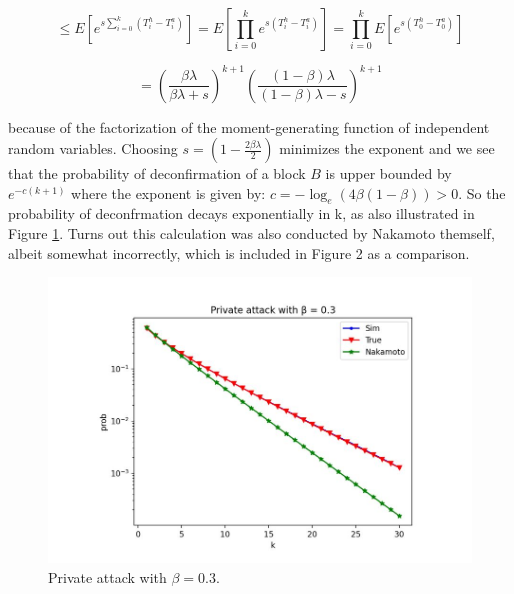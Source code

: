 \begin{equation}
    \leq E[e^{s\sum_{i=0}^{k}(T_{i}^{h} - T_{i}^{a})}] = E[\prod_{i=0}^{k}e^{s(T_{i}^{h} - T_{i}^{a})}] = \prod_{i=0}^{k}E[e^{s(T_{0}^{h} - T_{0}^{a})}]
\end{equation}

\begin{equation}
     = (\frac{\beta\lambda}{\beta \lambda + s})^{k + 1} (\frac{(1 - \beta) \lambda}{(1 - \beta) \lambda - s})^{k + 1}
\end{equation}

because of the factorization of the moment-generating function of independent random variables. Choosing $s = (1−\frac{2\beta\lambda}{2})$ minimizes the exponent and we see that the probability of deconfirmation of a block $B$ is upper bounded by $e^{−c(k+1)}$ where the exponent is given by:
$c = − \log_{e}(4\beta(1 - \beta)) > 0.$
So the probability of deconfrmation decays exponentially in k, as also illustrated in Figure \ref{fig:f2}. Turns out this calculation was also conducted by Nakamoto themself, albeit somewhat incorrectly, which is included in Figure 2 as a comparison.
\begin{figure}[h!]
    \centering
    \includegraphics[width=0.6\linewidth]{Fig/06/F2}
    \caption{Private attack with $\beta = 0.3$.}
    \label{fig:f2}
\end{figure}

